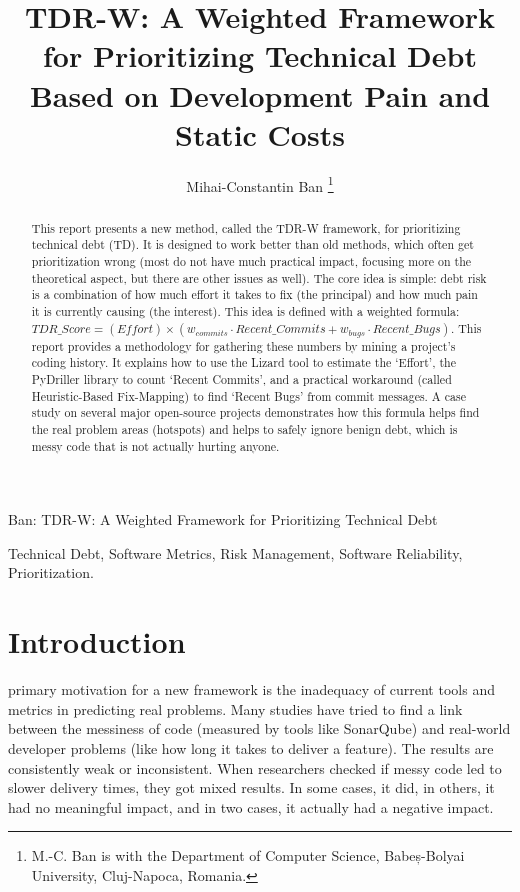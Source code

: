 \documentclass[journal]{IEEEtran}
\begin{document}
\title{TDR-W: A Weighted Framework for Prioritizing Technical Debt Based on Development Pain and Static Costs}

\author{Mihai-Constantin Ban
\thanks{M.-C. Ban is with the Department of Computer Science, Babeș-Bolyai University, Cluj-Napoca, Romania.}}

%
{Ban: TDR-W: A Weighted Framework for Prioritizing Technical Debt}

\maketitle

\begin{abstract}
This report presents a new method, called the TDR-W framework, for prioritizing technical debt (TD). It is designed to work better than old methods, which often get prioritization wrong (most do not have much practical impact, focusing more on the theoretical aspect, but there are other issues as well). The core idea is simple: debt risk is a combination of how much effort it takes to fix (the principal) and how much pain it is currently causing (the interest). This idea is defined with a weighted formula: $TDR\_Score = (Effort) \times (w_{commits} \cdot Recent\_Commits + w_{bugs} \cdot Recent\_Bugs)$. This report provides a methodology for gathering these numbers by mining a project's coding history. It explains how to use the Lizard tool to estimate the `Effort', the PyDriller library to count `Recent Commits', and a practical workaround (called Heuristic-Based Fix-Mapping) to find `Recent Bugs' from commit messages. A case study on several major open-source projects demonstrates how this formula helps find the real problem areas (hotspots) and helps to safely ignore benign debt, which is messy code that is not actually hurting anyone.
\end{abstract}

\begin{IEEEkeywords}
Technical Debt, Software Metrics, Risk Management, Software Reliability, Prioritization.
\end{IEEEkeywords}

\section{Introduction}
 primary motivation for a new framework is the inadequacy of current tools and metrics in predicting real problems. Many studies have tried to find a link between the messiness of code (measured by tools like SonarQube) and real-world developer problems (like how long it takes to deliver a feature). The results are consistently weak or inconsistent. When researchers checked if messy code led to slower delivery times, they got mixed results. In some cases, it did, in others, it had no meaningful impact, and in two cases, it actually had a negative impact.
\end{document}
